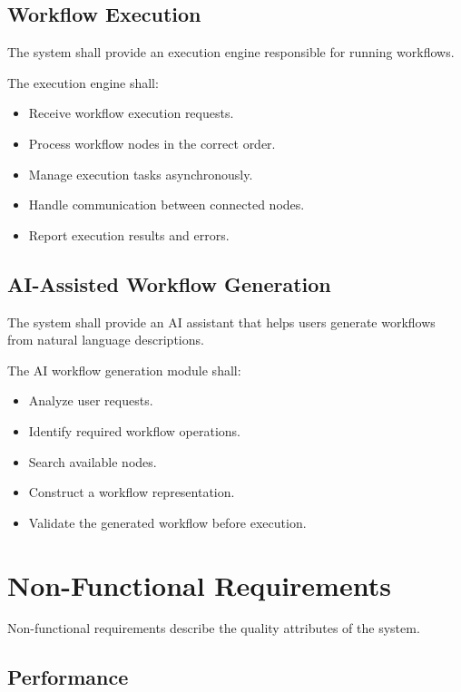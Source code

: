 \subsection{Workflow Execution}

The system shall provide an execution engine responsible for running workflows.

The execution engine shall:

\begin{itemize}
    \item Receive workflow execution requests.
    \item Process workflow nodes in the correct order.
    \item Manage execution tasks asynchronously.
    \item Handle communication between connected nodes.
    \item Report execution results and errors.
\end{itemize}

\subsection{AI-Assisted Workflow Generation}

The system shall provide an AI assistant that helps users generate workflows from natural language descriptions.

The AI workflow generation module shall:

\begin{itemize}
    \item Analyze user requests.
    \item Identify required workflow operations.
    \item Search available nodes.
    \item Construct a workflow representation.
    \item Validate the generated workflow before execution.
\end{itemize}

\section{Non-Functional Requirements}

Non-functional requirements describe the quality attributes of the system.

\subsection{Performance}


